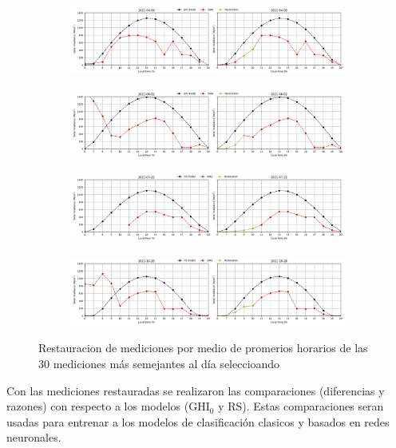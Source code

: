 \begin{figure}[H]
	\centering
	\begin{subfigure}{15cm}
		\includegraphics[width=15cm]{Graphics/2021-04-09.png}
	\end{subfigure}
	\begin{subfigure}{15cm}
		\includegraphics[width=15cm]{Graphics/2021-06-02.png}
	\end{subfigure}
	\begin{subfigure}{15cm}
		\includegraphics[width=15cm]{Graphics/2021-07-22.png}
	\end{subfigure}
	\begin{subfigure}{15cm}
		\includegraphics[width=15cm]{Graphics/2021-10-26.png}
	\end{subfigure}
	\caption{Restauracion de mediciones por medio de promerios horarios de las 30 mediciones más semejantes al día seleccioando}
	\label{fig:restoration}
\end{figure}

Con las mediciones restauradas se realizaron las comparaciones (diferencias y razones) con respecto a los modelos (GHI$_0$ y RS). Estas comparaciones seran usadas para entrenar a los modelos de clasificación clasicos y basados en redes neuronales.
